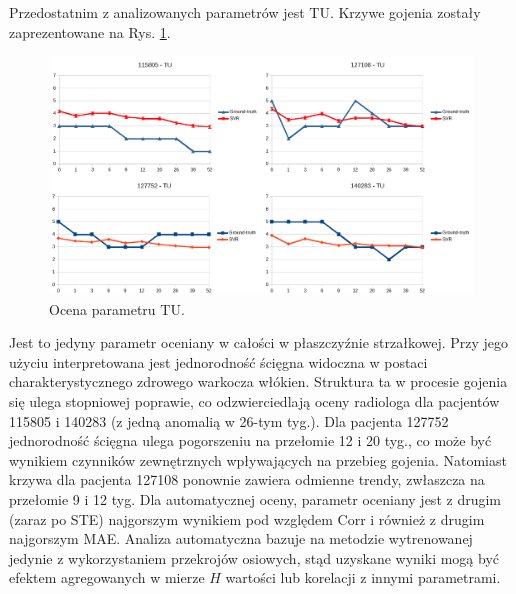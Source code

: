 Przedostatnim z analizowanych parametrów jest TU. Krzywe gojenia zostały zaprezentowane na Rys. \ref{fig:TU}.  
\begin{figure}[h!]
	\centering
	\includegraphics[width=1\textwidth]{figures/TU.png}
	\caption{Ocena parametru TU.}\label{fig:TU}
\end{figure}
Jest to jedyny parametr oceniany w całości w płaszczyźnie strzałkowej. Przy jego użyciu interpretowana jest jednorodność ścięgna widoczna w postaci charakterystycznego zdrowego warkocza włókien. Struktura ta w procesie gojenia się ulega stopniowej poprawie, co odzwierciedlają oceny radiologa dla pacjentów 115805 i 140283 (z jedną anomalią w 26-tym tyg.). Dla pacjenta 127752 jednorodność ścięgna ulega pogorszeniu na przełomie 12 i 20 tyg., co może być wynikiem czynników zewnętrznych wpływających na przebieg gojenia. Natomiast krzywa dla pacjenta 127108 ponownie zawiera odmienne trendy, zwłaszcza na przełomie 9 i 12 tyg. Dla automatycznej oceny, parametr oceniany jest z drugim (zaraz po STE) najgorszym wynikiem pod względem Corr i również z drugim najgorszym MAE. Analiza automatyczna bazuje na metodzie wytrenowanej jedynie z wykorzystaniem przekrojów osiowych, stąd uzyskane wyniki mogą być efektem agregowanych w mierze $H$ wartości lub korelacji z innymi parametrami. 

